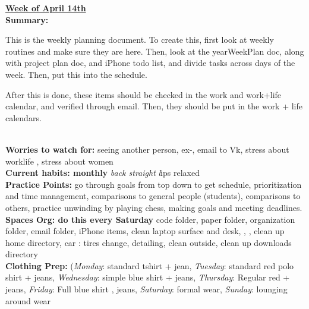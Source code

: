 

{\huge{\underline{\textbf{Week of April 14th}}}} \\
\textbf{Summary:} {\small This is the weekly planning document. To create
this, first look at weekly routines and make sure they are here. Then,
look at the yearWeekPlan doc, along with project plan doc, and iPhone
todo list, and divide tasks across days of the week. Then, put this
into the schedule.

After this is done, these items should be checked in the work and
work+life calendar, and verified through email.
Then, they should be put in the work + life
calendars.}\\

\textbf{Worries to watch for: }
{\small seeing another person,
ex-,
email to Vk,
stress about worklife , stress about women
}
\\
\textbf{Current habits: monthly}
{\small \textit{back straight}}
{\small \textit  lips relaxed }
\\
\textbf{Practice Points:} {\small go through goals from top down to get schedule, prioritization and time management,
comparisons to general people (students), comparisons to others, practice unwinding by playing chess, making goals and meeting deadlines}. \\

\textbf{Spaces Org: do this every Saturday } {\small code folder, paper folder, organization folder,  email folder, iPhone items, clean laptop surface and desk,
, , clean up home directory, car : tires change, detailing, clean outside, clean up downloads directory}\\


\textbf{Clothing Prep: }
{\small (\textit{Monday}: standard tshirt + jean, \textit{Tuesday}: standard red polo shirt + jeans, \textit{Wednesday}: simple blue shirt + jeans,
 \textit{Thursday}: Regular red + jeans, \textit{Friday}: Full blue shirt , jeans, \textit{Saturday}: formal wear,  \textit{Sunday}: lounging around wear
 }\\

